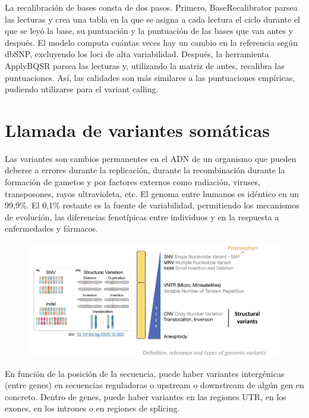 La recalibración de bases consta de dos pasos. Primero, BaseRecalibrator parsea las lecturas y crea una tabla en la que se asigna a cada lectura el ciclo durante el que se leyó la base, su puntuación y la puntuación de las bases que van antes y después. El modelo computa cuántas veces hay un cambio en la referencia según dbSNP, excluyendo los loci de alta variabilidad. Después, la herramienta ApplyBQSR parsea las lecturas y, utilizando la matriz de antes, recalibra las puntuaciones. Así, las calidades son más similares a las puntuaciones empíricas, pudiendo utilizarse para el variant calling.

\section{Llamada de variantes somáticas}
Las variantes son cambios permanentes en el ADN de un organismo que pueden deberse a errores durante la replicación, durante la recombinación durante la formación de gametos y por factores externos como radiación, viruses, transposones, rayos ultravioleta, etc. El genoma entre humanos es idéntico en un 99,9\%. El 0,1\% restante es la fuente de variabilidad, permitiendo los mecanismos de evolución, las diferencias fenotípicas entre individuos y en la respuesta a enfermedades y fármacos. 

\begin{figure}[htbp]
\centering
\includegraphics[width = \textwidth]{figs/variants-size.png}
\end{figure}

En función de la posición de la secuencia, puede haber variantes intergénicas (entre genes) en secuencias reguladoras o upstream o downstream de algún gen en concreto. Dentro de genes, puede haber variantes en las regiones UTR, en los exones, en los intrones o en regiones de splicing. 

